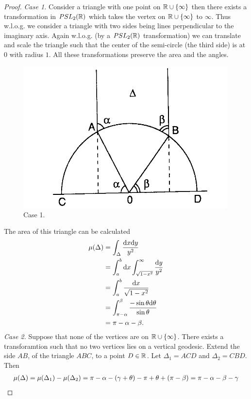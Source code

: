 \begin{proof}
  \textit{Case 1.} Consider a triangle with one point on $\mathbb{R}\cup\{\infty\}$ then there exists a transformation in $PSL_2(\mathbb{R})$ which takes the vertex on $\mathbb{R}\cup \{\infty\}$ to $\infty$. Thus w.l.o.g. we consider a triangle with two sides being lines perpendicular to the imaginary axis. Again w.l.o.g. (by a $PSL_2(\mathbb{R})$ transformation) we can translate and scale the triangle such that the center of the semi-circle (the third side) is at $0$ with radius $1$. All these transformations preserve the area and the angles. 
\begin{figure}[h]
  \centering
  \includegraphics[scale=0.5]{figures/gauss-bonnet.png}
  \caption{Case 1.}
\end{figure}
The area of this triangle can be calculated
\begin{align*}
  \mu(\Delta) &= \int_{\Delta} \frac{\dd x \dd y}{y^2}\\
       &= \int^b_a \dd x \int_{\sqrt{1-x^2}}^\infty \frac{\dd y}{y^2}\\
       &= \int^b_a \frac{\dd x}{\sqrt{1-x^2}}\\
       &= \int_{\pi-\alpha}^\beta \frac{-\sin\theta \dd \theta}{\sin\theta}\\
       &= \pi - \alpha - \beta.\\
\end{align*}
\textit{Case 2.} Suppose that none of the vertices are on $\mathbb{R}\cup \{\infty\}$. There exists a transforamtion such that no two vertices lies on a vertical geodesic. Extend the side $AB$, of the triangle $ABC$, to a point $D\in \mathbb{R}$. Let $\Delta_1 = ACD$ and $\Delta_2 = CBD$. Then
\begin{align*}
  \mu(\Delta) = \mu(\Delta_1) - \mu(\Delta_2) = \pi - \alpha - (\gamma+\theta) - \pi + \theta + (\pi - \beta) = \pi - \alpha - \beta - \gamma
\end{align*}

\end{proof}
